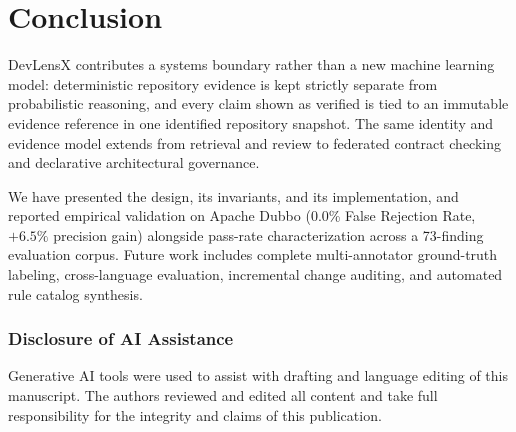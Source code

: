 \documentclass[runningheads]{llncs}
\begin{document}
\section{Conclusion}
DevLensX contributes a systems boundary rather than a new machine learning model: deterministic repository evidence is kept strictly separate from probabilistic reasoning, and every claim shown as verified is tied to an immutable evidence reference in one identified repository snapshot. The same identity and evidence model extends from retrieval and review to federated contract checking and declarative architectural governance. 

We have presented the design, its invariants, and its implementation, and reported empirical validation on Apache Dubbo (0.0\% False Rejection Rate, $+6.5\%$ precision gain) alongside pass-rate characterization across a 73-finding evaluation corpus. Future work includes complete multi-annotator ground-truth labeling, cross-language evaluation, incremental change auditing, and automated rule catalog synthesis.

\subsubsection*{Disclosure of AI Assistance}
Generative AI tools were used to assist with drafting and language editing of this manuscript. The authors reviewed and edited all content and take full responsibility for the integrity and claims of this publication.
\end{document}
